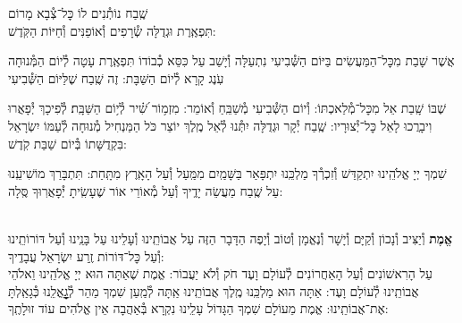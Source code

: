 \documentclass[twoside, openany, parskip=half, 11pt]{book}
\begin{document}
\shatz שֶֽׁבַח נוֹתְ֯נִים לוֹ כׇּל־צְ֯בָא מָרוֹם \\
תִּפְאֶֽרֶת וּגְדֻלָּה שְׂ֯רָפִים וְ֯אוֹפַנִּים וְ֯חַיּוֹת הַקֹּֽדֶשׁ:

\chazzan {}
אֲשֶׁר שָׁבַת מִכׇּל־הַמַּעֲשִׂים בַּיּוֹם הַשְּׁ֯בִיעִי נִתְעַלָּה וְ֯יָשַׁב עַל כִּסֵּא כְ֯בוֹדוֹ תִּפְאֶֽרֶת עָטָה לְ֯יוֹם הַמְּ֯נוּחָה עֹֽנֶג קָרָא לְ֯יוֹם הַשַּׁבָּת: זֶה שֶֽׁבַח שֶׁלַּיּוֹם הַשְּׁ֯בִיעִי

\kahal
שֶׁבּוֹ שָֽׁבַת אֵל מִכׇּל־מְ֯לַאכְתּוֹ: וְ֯יוֹם הַשְּׁ֯בִיעִי מְ֯שַׁבֵּֽחַ וְ֯אוֹמֵר:
%
מִזְמ֥וֹר שִׁ֝֗יר לְ֯י֥וֹם הַשַּׁבָּֽת׃ לְ֯פִיכָךְ יְ֯פָאֲרוּ וִיבָרֲכוּ לָאֵל כׇּל־יְ֯צוּרָיו: שֶֽׁבַח יְ֯קָר וּגְדֻלָּה יִתְּ֯נוּ לְ֯אֵל מֶֽלֶךְ יוֹצֵר כֹּל הַמַּנְחִיל מְ֯נוּחָה לְ֯עַמּוֹ יִשְׂרָאֵל בִּקְדֻשָּׁתוֹ בְּ֯יוֹם שַׁבַּת קֹֽדֶשׁ:

\chazzan
שִׁמְךָ יְיָ אֱלֹהֵֽינוּ יִתְקַדַּשׁ וְ֯זִכְרְ֯ךָ מַלְכֵּֽנוּ יִתְפָּאַר בַּשָּׁמַֽיִם מִמַּֽעַל וְ֯עַל הָאָֽרֶץ מִתָּֽחַת:
תִּתְבָּרַךְ מוֹשִׁיעֵֽנוּ עַל שֶֽׁבַח מַעֲשֵׂה יָדֶֽיךָ וְ֯עַל מְ֯אוֹרֵי אוֹר שֶׁעָשִֽׂיתָ יְ֯פָאֲרֽוּךָ סֶּֽלָה:


\label{tisbarach}
\yotzerhameoros

\ahavaraba

\shema

\veahavta

\vehaya

\vayomer{}

 \smallskip

\begin{paracol}{2}
\\
\textbf{
אֱמֶת
}
וְ֯יַצִּיב וְ֯נָכוֹן וְ֯קַיָּם וְ֯יָשָׁר וְ֯נֶאֱמָן וְ֯טוֹב וְ֯יָפֶה הַדָּבָר הַזֶּה עַל אֲבוֹתֵֽינוּ וְ֯עָלֵינוּ עַל בָּנֵֽינוּ וְ֯עַל דּוֹרוֹתֵֽינוּ וְ֯עַל כׇּל־דּוֹרוֹת זֶֽרַע יִשְׂרָאֵל עֲבָדֶֽיךָ:\\
עַל הָרִאשׁוֹנִים וְ֯עַל הָאַחֲרוֹנִים לְ֯עוֹלָם וָעֶד חֹק וְ֯לֹא יַעֲבוֹר: אֱמֶת שֶׁאַתָּה הוּא יְיָ אֱלֹהֵֽינוּ וֵאלֹהֵי אֲבוֹתֵֽינוּ לְ֯עוֹלָם וָעֶד: אַתָּה הוּא מַלְכֵּֽנוּ מֶֽלֶךְ אֲבוֹתֵֽינוּ אַֽתָּה לְ֯מַֽעַן שִׁמְךָ מַהֵר לְ֯גׇׇׇׇׇׇׇׇׇׇׇׇאֳלֵֽנוּ כְּ֯גָאַֽלְתָּ אֶת־אֲבוֹתֵֽינוּ: אֱמֶת מֵעוֹלָם שִׁמְךָ הַגָּדוֹל עָלֵֽינוּ נִקְרָא בְּ֯אַהֲבָה אֵין אֱלֹהִים עוֹד זוּלָתֶֽךָ:

\switchcolumn

\emesveyatziv

\end{paracol}

\ezrasavoseinu

\clearpage

\gaalyisroel
\end{document}
